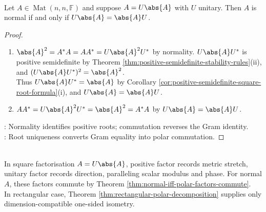 \begin{theorem} \label{thm:normal-iff-polar-factors-commute} \\
Let $A\in\operatorname{Mat}(n,n,\mathbb{F})$ and suppose $A=U\abs{A}$ with $U$ unitary. Then $A$ is normal if and only if $U\abs{A}=\abs{A}U$.
\begin{proof}
\begin{enumerate}[label=\roman*.]
\setlength{\itemsep}{0pt}
\item[$(\Rightarrow)$] $\abs{A}^2=A^*A=AA^*=U\abs{A}^2U^*$ by normality. $U\abs{A}U^*$ is positive semidefinite by Theorem \ref{thm:positive-semidefinite-stability-rules}(ii), and $(U\abs{A}U^*)^2=\abs{A}^2$.\\
Thus $U\abs{A}U^*=\abs{A}$ by Corollary \ref{cor:positive-semidefinite-square-root-formula}(i), and $U\abs{A}=\abs{A}U$.
\item[$(\Leftarrow)$] $AA^*=U\abs{A}^2U^*=\abs{A}^2=A^*A$ by $U\abs{A}=\abs{A}U$.
\end{enumerate}
: Normality identifies positive roots; commutation reverses the Gram identity.\\
: Root uniqueness converts Gram equality into polar commutation.
\end{proof}
\end{theorem}

\begin{perspective} \label{per:polar-decomposition-spectral-analogy} \\
In square factorisation $A=U\abs{A}$, positive factor records metric stretch, unitary factor records direction, paralleling scalar modulus and phase. For normal $A$, these factors commute by Theorem \ref{thm:normal-iff-polar-factors-commute}.\\
In rectangular case, Theorem \ref{thm:rectangular-polar-decomposition} supplies only dimension-compatible one-sided isometry.
\end{perspective}

